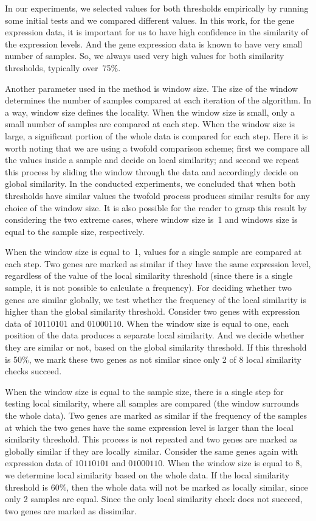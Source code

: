 In our experiments, we selected values for both thresholds empirically by running some initial tests and we
compared different values. In this work, for the gene expression data, it is important for us to have high
confidence in the similarity of the expression levels. And the gene expression data is known to have very
small number of samples. So, we always used very high values for both similarity thresholds, typically
over~75\%.

Another parameter used in the method is window size. The size of the window determines the number of samples
compared at each iteration of the algorithm. In a way, window size defines the locality. When the window size
is small, only a small number of samples are compared at each step. When the window size is large, a
significant portion of the whole data is compared for each step. Here it is worth noting that we are using a
twofold comparison scheme; first we compare all the values inside a sample and decide on local similarity;
and second we repeat this process by sliding the window through the data and accordingly decide on global
similarity. In the conducted experiments, we concluded that when both thresholds have similar values the
twofold process produces similar results for any choice of the window size. It is also possible for the
reader to grasp this result by considering the two extreme cases, where window size is~1 and windows size is
equal to the sample size, respectively.

When the window size is equal to~1, values for a single sample are compared at each step. Two genes are
marked as similar if they have the same expression level, regardless of the value of the local similarity
threshold (since there is a single sample, it is not possible to calculate a frequency). For deciding whether
two genes are similar globally, we test whether the frequency of the local similarity is higher than the
global similarity threshold. Consider two genes with expression data of $10110101$ and $01000110$. When the window size is equal to one, each position of the data produces a separate local similarity. And we decide whether they are similar or not, based on the global similarity threshold. If this threshold is 50\%, we mark these two genes as not similar since only 2 of 8 local similarity checks  succeed.

When the window size is equal to the sample size, there is a single step for testing local similarity, where
all samples are compared (the window surrounds the whole data). Two genes are marked as similar if the
frequency of the samples at which the two genes have the same expression level is larger than the local
similarity threshold. This process is not repeated and two genes are marked as globally similar if they are
locally~similar. Consider the same genes again with expression data of $10110101$ and $01000110$. When the window size is equal to 8, we determine local similarity based on the whole data. If the local similarity threshold is 60\%, then the whole data will not be marked as locally similar, since only 2 samples are equal. Since the only local similarity check does not succeed, two genes are marked as dissimilar.


